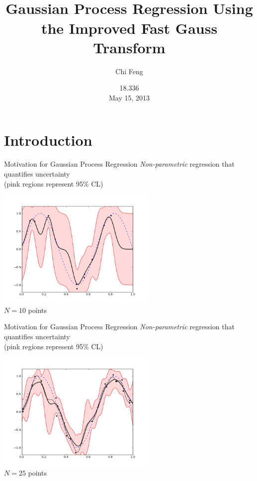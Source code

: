 \documentclass[xcolor=pdftex,dvipsnames,table]{beamer}
\title{\\
Gaussian Process Regression Using the Improved Fast Gauss Transform}
\author{Chi Feng}
\date{18.336 \\ May 15, 2013}
\begin{document}
\maketitle

\section{Introduction}
\begin{frame}{Motivation for Gaussian Process Regression}
  \emph{Non-parametric} regression that quantifies uncertainty \\
  (pink regions represent 95\% CL)
  \begin{center}\includegraphics[width=3in]{gpr.png}\\$N=10$ points\end{center}
\end{frame}
\begin{frame}{Motivation for Gaussian Process Regression}
  \emph{Non-parametric} regression that quantifies uncertainty \\
  (pink regions represent 95\% CL)
  \begin{center}\includegraphics[width=3in]{gpr2.png}\\$N=25$ points\end{center}
\end{frame}
\end{document}
